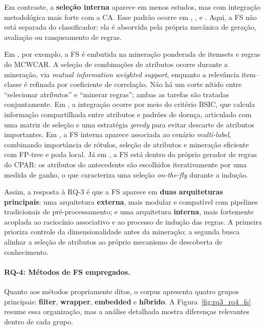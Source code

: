 Em contraste, a \textbf{seleção interna} aparece em menos estudos, mas com integração metodológica mais forte com a CA. Esse padrão ocorre em \cite{wu2024novel}, \cite{gayathri2015efficient}, \cite{hou2025improved} e \cite{nandhini2020performance}. Aqui, a FS não está separada do classificador: ela é absorvida pela própria mecânica de geração, avaliação ou ranqueamento de regras.

Em \cite{wu2024novel}, por exemplo, a FS é embutida na mineração ponderada de itemsets e regras do MCWCAR. A seleção de combinações de atributos ocorre durante a mineração, via \textit{mutual information weighted support}, enquanto a relevância item--classe é refinada por coeficiente de correlação. Não há um corte nítido entre “selecionar atributos” e “minerar regras”; ambas as tarefas são tratadas conjuntamente. Em \cite{gayathri2015efficient}, a integração ocorre por meio do critério BSIC, que calcula informação compartilhada entre atributos e padrões de doença, articulado com uma matriz de seleção e uma estratégia \textit{greedy} para evitar descarte de atributos importantes. Em \cite{hou2025improved}, a FS interna aparece associada ao cenário \textit{multi-label}, combinando importância de rótulos, seleção de atributos e mineração eficiente com FP-tree e poda local. Já em \cite{nandhini2020performance}, a FS está dentro do próprio gerador de regras do CPAR: os atributos do antecedente são escolhidos iterativamente por uma medida de ganho, o que caracteriza uma seleção \emph{on-the-fly} durante a indução.

Assim, a resposta à RQ-3 é que a FS aparece em \textbf{duas arquiteturas principais}: uma arquitetura \textbf{externa}, mais modular e compatível com pipelines tradicionais de pré-processamento; e uma arquitetura \textbf{interna}, mais fortemente acoplada ao raciocínio associativo e ao processo de indução das regras. A primeira prioriza controle da dimensionalidade antes da mineração; a segunda busca alinhar a seleção de atributos ao próprio mecanismo de descoberta de conhecimento.

\paragraph*{RQ-4: Métodos de FS empregados.}
Quanto aos métodos propriamente ditos, o corpus apresenta quatro grupos principais: \textbf{filter}, \textbf{wrapper}, \textbf{embedded} e \textbf{híbrido}. A Figura~\ref{fig:rq3_rq4_fs} resume essa organização, mas a análise detalhada mostra diferenças relevantes dentro de cada grupo.

